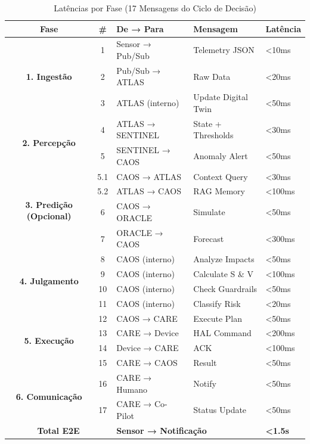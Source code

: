 \documentclass[12pt, a4paper]{article}
\begin{document}
\begin{table}[h!]
\centering
\small
\begin{tabular}{|c|c|l|l|l|}
\hline
\textbf{Fase} & \textbf{\#} & \textbf{De → Para} & \textbf{Mensagem} & \textbf{Latência} \\ \hline
\multirow{3}{*}{\textbf{1. Ingestão}} & 1 & Sensor → Pub/Sub & Telemetry JSON & <10ms \\ \cline{2-5}
& 2 & Pub/Sub → ATLAS & Raw Data & <20ms \\ \cline{2-5}
& 3 & ATLAS (interno) & Update Digital Twin & <50ms \\ \hline
\multirow{2}{*}{\textbf{2. Percepção}} & 4 & ATLAS → SENTINEL & State + Thresholds & <30ms \\ \cline{2-5}
& 5 & SENTINEL → CAOS & Anomaly Alert & <50ms \\ \hline
\multirow{4}{*}{\textbf{3. Predição (Opcional)}} & 5.1 & CAOS → ATLAS & Context Query & <30ms \\ \cline{2-5}
& 5.2 & ATLAS → CAOS & RAG Memory & <100ms \\ \cline{2-5}
& 6 & CAOS → ORACLE & Simulate & <50ms \\ \cline{2-5}
& 7 & ORACLE → CAOS & Forecast & <300ms \\ \hline
\multirow{4}{*}{\textbf{4. Julgamento}} & 8 & CAOS (interno) & Analyze Impacts & <50ms \\ \cline{2-5}
& 9 & CAOS (interno) & Calculate S \& V & <100ms \\ \cline{2-5}
& 10 & CAOS (interno) & Check Guardrails & <50ms \\ \cline{2-5}
& 11 & CAOS (interno) & Classify Risk & <20ms \\ \hline
\multirow{4}{*}{\textbf{5. Execução}} & 12 & CAOS → CARE & Execute Plan & <50ms \\ \cline{2-5}
& 13 & CARE → Device & HAL Command & <200ms \\ \cline{2-5}
& 14 & Device → CARE & ACK & <100ms \\ \cline{2-5}
& 15 & CARE → CAOS & Result & <50ms \\ \hline
\multirow{2}{*}{\textbf{6. Comunicação}} & 16 & CARE → Humano & Notify & <50ms \\ \cline{2-5}
& 17 & CARE → Co-Pilot & Status Update & <50ms \\ \hline
\multicolumn{2}{|c|}{\textbf{Total E2E}} & \multicolumn{2}{l|}{\textbf{Sensor → Notificação}} & \textbf{<1.5s} \\ \hline
\end{tabular}
\caption{Latências por Fase (17 Mensagens do Ciclo de Decisão)}
\end{table}
\end{document}
